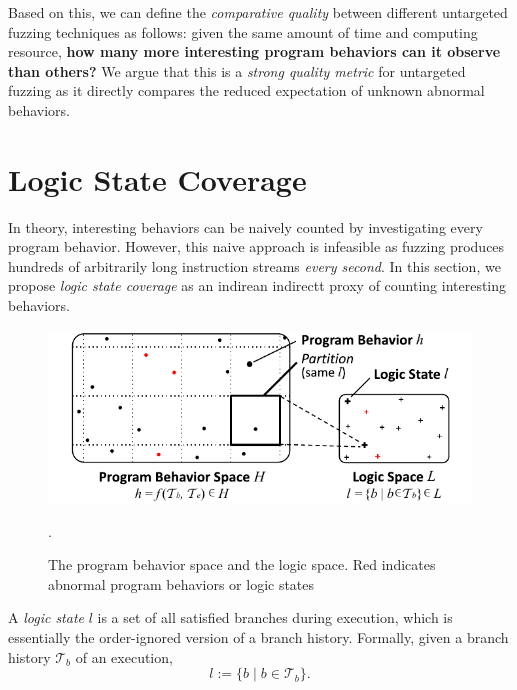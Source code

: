\documentclass[letterpaper,twocolumn,10pt]{article}
\begin{document}
Based on this, we can define the \emph{comparative quality} between
different untargeted fuzzing techniques as follows: given the same amount of
time and computing resource, \textbf{how many more interesting program behaviors
can it observe than others?} We argue that this is a \emph{strong quality
metric} for untargeted fuzzing as it directly compares the reduced expectation
of unknown abnormal behaviors. 



\section{Logic State Coverage}
\label{s:lscov}

In theory, interesting behaviors can be naively counted by investigating
every program behavior. However, this naive approach is infeasible as
fuzzing produces hundreds of arbitrarily long instruction streams \emph{every
second}.
%
In this section, we propose \emph{logic state coverage} as an indirean indirectt proxy of
counting interesting behaviors.


\begin{figure}[t]
  \centering
  \includegraphics[width=\columnwidth]{images/prog-to-logic.pdf}
  \caption{The program behavior space and the logic space. Red indicates
  abnormal program behaviors or logic states}.
  \label{f:prog-to-logic}
\end{figure}

%
A \emph{logic state} $l$ is a set of all satisfied branches during execution,
which is essentially the order-ignored version of a branch history. Formally,
given a branch history $\mathcal{T}_b$ of an execution,
%
\begin{equation}
\label{e:ls}
  l := \{b \mid b \in \mathcal{T}_b\}.
\end{equation}
\end{document}
